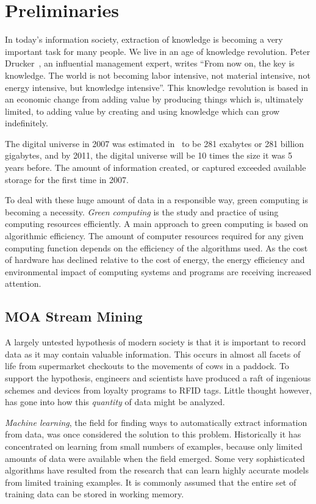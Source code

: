 \chapter{Preliminaries}
\label{chap:introduction}

In today's information society, extraction of knowledge is becoming a very
important task for many people. We live in an age of knowledge revolution.
Peter Drucker~\cite{Drucker}, an influential management expert, writes ``From now on, the key is knowledge. The world is not becoming labor intensive, not material intensive, not energy intensive, but knowledge  intensive''.
This knowledge revolution is based in an economic 
change from adding value by producing things which is, ultimately 
limited, to adding value by creating and using knowledge which can 
grow indefinitely.

The digital universe in 2007 was estimated in~\cite{IDC} to be 281 exabytes
or 281 billion gigabytes, and by 2011, the digital universe will be 
10 times the size it was 5 years before. The amount of information created, 
or captured %
exceeded available storage for the first time in
2007. 

To deal with these huge amount of data in a responsible way,
green computing is becoming a necessity. {\em Green computing} 
is the study and practice of using computing resources efficiently.
A main approach to green computing is based on algorithmic efficiency.
The amount of computer resources required for any given computing function
depends on the efficiency of the algorithms used. As the cost of hardware
has declined relative to the cost of energy, the energy efficiency and 
environmental impact of computing systems and programs 
are receiving increased attention.


\section{MOA Stream Mining }

A largely untested hypothesis of modern society is that it is important to record data as it may contain valuable information. This occurs in almost all facets of life from supermarket checkouts to the movements of cows in a paddock. To support the hypothesis, engineers and scientists have produced a raft of ingenious schemes and devices from loyalty programs to RFID tags. Little thought however, has gone into how this {\em quantity} of data might be analyzed. 

{\em Machine learning}, the field for finding ways to automatically extract information from data, was once considered the solution to this problem. Historically it has concentrated on learning from small numbers of examples, because only limited amounts of data were available when the field emerged. Some very sophisticated algorithms have resulted from the research that can learn highly accurate models from limited training examples. It is commonly assumed that the entire set of training data can be stored in working memory.

